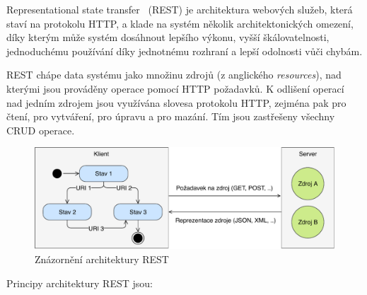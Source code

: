 Representational state transfer~\cite{fielding2000rest} (\gls{REST}) je architektura
webových služeb, která staví na protokolu \gls{HTTP}, a klade na systém
několik architektonických omezení, díky kterým může systém dosáhnout
lepšího výkonu, vyšší škálovatelnosti, jednoduchému používání díky jednotnému rozhraní
a lepší odolnosti vůči chybám.

\gls{REST} chápe data systému jako množinu zdrojů (z anglického \textit{resources}),
nad kterými jsou prováděny operace pomocí \gls{HTTP} požadavků. K odlišení operací
nad jedním zdrojem jsou využívána slovesa protokolu \gls{HTTP}, zejména pak  pro čtení,
 pro vytváření,  pro úpravu a  pro mazání. Tím jsou zastřešeny
všechny \gls{CRUD} operace.

\begin{figure}[t]
    \centering
    \includegraphics[keepaspectratio=true, width=0.9\linewidth]{figures/rest-statelessness.pdf}
    \caption{Znázornění architektury \gls{REST}}
    \label{fig:rest-statelessness}
\end{figure}

Principy architektury \gls{REST} jsou:


